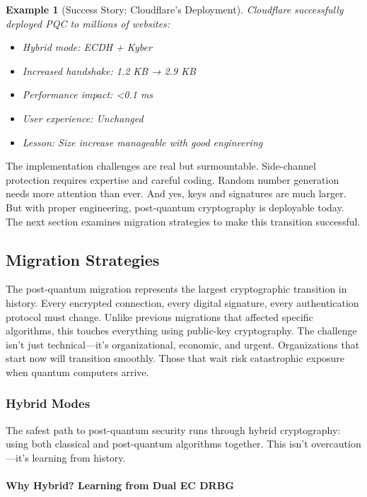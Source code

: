 \documentclass[11pt,a4paper]{article}
\newtheorem{example}{Example}
\begin{document}
\begin{example}[Success Story: Cloudflare's Deployment]
Cloudflare successfully deployed PQC to millions of websites:
\begin{itemize}
    \item Hybrid mode: ECDH + Kyber
    \item Increased handshake: 1.2 KB → 2.9 KB
    \item Performance impact: <0.1 ms
    \item User experience: Unchanged
    \item Lesson: Size increase manageable with good engineering
\end{itemize}
\end{example}

The implementation challenges are real but surmountable. Side-channel protection requires expertise and careful coding. Random number generation needs more attention than ever. And yes, keys and signatures are much larger. But with proper engineering, post-quantum cryptography is deployable today. The next section examines migration strategies to make this transition successful.

\subsection{Migration Strategies}
\label{sec:migration}

The post-quantum migration represents the largest cryptographic transition in history. Every encrypted connection, every digital signature, every authentication protocol must change. Unlike previous migrations that affected specific algorithms, this touches everything using public-key cryptography. The challenge isn't just technical—it's organizational, economic, and urgent. Organizations that start now will transition smoothly. Those that wait risk catastrophic exposure when quantum computers arrive.

\subsubsection{Hybrid Modes}

The safest path to post-quantum security runs through hybrid cryptography: using both classical and post-quantum algorithms together. This isn't overcaution—it's learning from history.

\paragraph{Why Hybrid? Learning from Dual EC DRBG}
\end{document}
